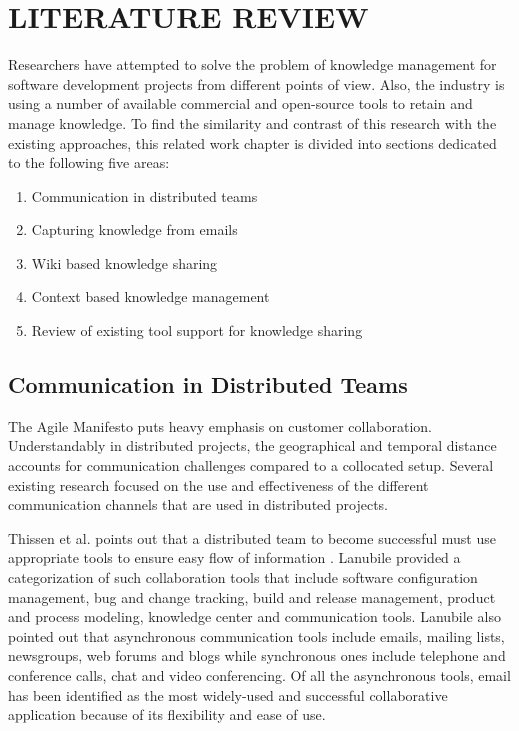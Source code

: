 \fancyhead[RO,LE]{\thepage}
\fancyfoot{} 
\chapter{LITERATURE REVIEW}
Researchers have attempted to solve the problem of knowledge management for software development projects from different points of view. Also, the industry is using a number of available commercial and open-source tools to retain and manage knowledge. To find the similarity and contrast of this research with the existing approaches, this related work chapter is divided into sections dedicated to the following five areas:

\begin{enumerate}
	\item Communication in distributed teams
	\item Capturing knowledge from emails
	\item Wiki based knowledge sharing
	\item Context based knowledge management
	\item Review of existing tool support for knowledge sharing
\end{enumerate}

\section{Communication in Distributed Teams}
The Agile Manifesto\cite{agile_manifesto} puts heavy emphasis on customer collaboration. Understandably in distributed projects, the geographical and temporal distance accounts for communication challenges compared to a collocated setup. Several existing research focused on the use and effectiveness of the different communication channels that are used in distributed projects.

Thissen et al. points out that a distributed team to become successful must use appropriate tools to ensure easy flow of information \cite{communication_tools}. Lanubile provided a categorization of such collaboration tools \cite{communication_in_distributed} that include software configuration management, bug and change tracking, build and release management, product and process modeling, knowledge center and communication tools. Lanubile also pointed out that asynchronous communication tools include emails, mailing lists, newsgroups, web forums and blogs while synchronous ones include telephone and conference calls, chat and video conferencing. Of all the asynchronous tools, email has been identified as the most widely-used and successful collaborative application because of its flexibility and ease of use.

